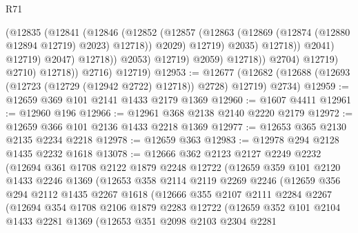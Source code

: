 \begin{lexlean}{R71}
\begin{coremodule}
                                      (@12835
                                        (@12841
                                          (@12846
                                            (@12852
                                              (@12857
                                                (@12863
                                                  (@12869
                                                    (@12874 (@12880 @12894 @12719) @2023)
                                                    @12718))
                                                @2029)
                                              @12719)
                                            @2035)
                                          @12718))
                                      @2041)
                                    @12719)
                                  @2047)
                                @12718))
                            @2053)
                          @12719)
                        @2059)
                      @12718))
                  @2704)
                @12719)
              @2710)
            @12718))
        @2716)
      @12719)
@12953 := @12677
    (@12682 (@12688 (@12693 (@12723 (@12729 (@12942 @2722) @12718)) @2728) @12719) @2734)
@12959 := @12659 @369 @101 @2141 @1433 @2179 @1369
@12960 := @1607 @4411
@12961 := @12960 @196
@12966 := @12961 @368 @2138 @2140 @2220 @2179
@12972 := @12659 @366 @101 @2136 @1433 @2218 @1369
@12977 := @12653 @365 @2130 @2135 @2234 @2218
@12978 := @12659 @363
@12983 := @12978 @294 @2128 @1435 @2232 @1618
@13078 := @12666
    @362
    @2123
    @2127
    @2249
    @2232
    (@12694
      @361
      @1708
      @2122
      @1879
      @2248
      @12722
      (@12659
        @359
        @101
        @2120
        @1433
        @2246
        @1369
        (@12653
          @358
          @2114
          @2119
          @2269
          @2246
          (@12659
            @356
            @294
            @2112
            @1435
            @2267
            @1618
            (@12666
              @355
              @2107
              @2111
              @2284
              @2267
              (@12694
                @354
                @1708
                @2106
                @1879
                @2283
                @12722
                (@12659
                  @352
                  @101
                  @2104
                  @1433
                  @2281
                  @1369
                  (@12653
                    @351
                    @2098
                    @2103
                    @2304
                    @2281

\end{coremodule}
\end{lexlean}
